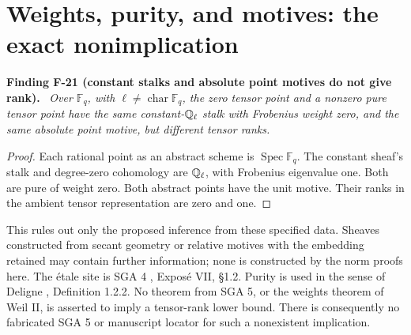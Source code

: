 \documentclass[11pt]{article}
\newcommand{\Spec}{\operatorname{Spec}}\newcommand{\rank}{\operatorname{rank}}
\newenvironment{finding}[2]{\par\medskip\noindent\textbf{Finding #1 (#2).}\ \itshape}{\par\medskip}
\begin{document}
\section{Weights, purity, and motives: the exact nonimplication}
\begin{finding}{F-21}{constant stalks and absolute point motives do not give rank}
Over $\mathbb F_q$, with $\ell\ne\operatorname{char}\mathbb F_q$,
the zero tensor point and a nonzero pure tensor point have the
same constant-$\mathbb Q_\ell$ stalk with Frobenius weight zero, and
the same absolute point motive, but different tensor ranks.
\end{finding}
\begin{proof}
Each rational point as an abstract scheme is $\Spec\mathbb F_q$.
The constant sheaf's stalk and degree-zero cohomology are
$\mathbb Q_\ell$, with Frobenius eigenvalue one. Both are pure of
weight zero. Both abstract points have the unit motive.
Their ranks in the ambient tensor representation are zero and one.
\end{proof}
This rules out only the proposed inference from these specified
data. Sheaves constructed from secant geometry or relative motives
with the embedding retained may contain further information;
none is constructed by the norm proofs here.
The \'etale site is SGA 4 \cite{SGA4}, Expos\'e VII, \S1.2.
Purity is used in the sense of Deligne \cite{WeilII},
Definition 1.2.2. No theorem from SGA 5, or the weights theorem
of Weil II, is asserted to imply a tensor-rank lower bound.
There is consequently no fabricated SGA 5 or manuscript locator
for such a nonexistent implication.
\end{document}
